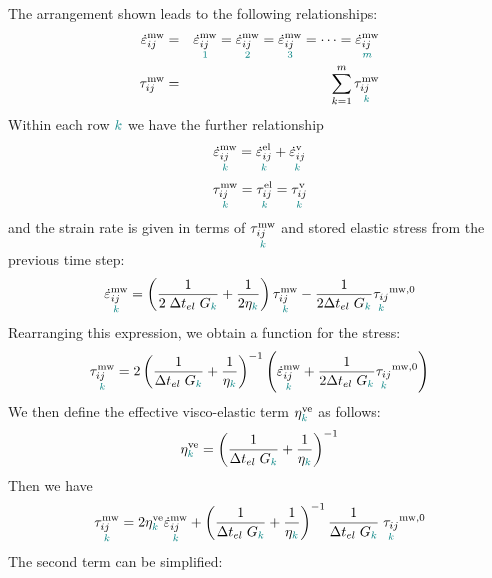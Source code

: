 The arrangement shown leads to the following relationships:
\begin{eqnarray}
\dot\varepsilon_{ij}^{\rm mw} &=&  
\underset{\color{teal} 1}{\dot\varepsilon_{ij}^{\rm mw}}  
=\underset{\color{teal}2}{\dot\varepsilon_{ij}^{\rm mw}}  
=\underset{\color{teal} 3}{\dot\varepsilon_{ij}^{\rm mw}}  
=\dots
=\underset{\color{teal} m}{\dot\varepsilon_{ij}^{\rm mw}} \label{eqbob1}
\\
\tau_{ij}^{\rm mw} &=&  \sum_{k=1}^m  \underset{\color{teal}k}{\tau_{ij}^{\rm mw}}
\label{eqbob2}
\end{eqnarray}
Within each row ${\color{teal}k}$ we have the further relationship
\[
\underset{\color{teal}k}{\dot\varepsilon_{ij}^{\rm mw}}  
=\underset{\color{teal} k}{\dot\varepsilon_{ij}^{\rm el}}  
+\underset{\color{teal} k}{\dot\varepsilon_{ij}^{\rm v}}  
\]
\[
\underset{\color{teal} k}{\tau_{ij}^{\rm mw}} 
= \underset{\color{teal} k}{\tau_{ij}^{\rm el}} 
= \underset{\color{teal} k}{\tau_{ij}^{\rm v}}  
\]
and the strain rate is given in terms of 
$\underset{\color{teal} k}{\tau_{ij}^{\rm mw}}$
and stored elastic stress from the previous time step:
\[
\underset{\color{teal}k}{\dot\varepsilon_{ij}^{\rm mw}}
=\left(
\frac{1}{2\; \Delta t_{el} \; G_{\color{teal}k} } 
+ \frac{1}{2 \eta_{\color{teal}k}} 
\right)
\underset{\color{teal} k}{\tau_{ij}^{\rm mw}}
- \frac{1}{2 \Delta t_{el} \; G_{\color{teal}k}  }
\underset{\color{teal} k}{\tau_{ij}}^{\rm mw,0}
\]
Rearranging this expression, we obtain a function for the stress:
\[
\underset{\color{teal} k}{\tau_{ij}^{\rm mw}}
= 2 
\left(
\frac{1}{\Delta t_{el} \; G_{\color{teal}k} } 
+ \frac{1}{\eta_{\color{teal}k}}
\right) ^{-1}
\left(
\underset{\color{teal}k}{\dot\varepsilon_{ij}^{\rm mw}}
+ \frac{1}{2 \Delta t_{el} \; G_{\color{teal}k}  }
\underset{\color{teal} k}{\tau_{ij}}^{\rm mw,0}
\right)
\]
We then define the effective visco-elastic term $\eta^{\rm ve}_{\color{teal}k}$
as follows:
\[
\eta^{\rm ve}_{\color{teal}k}
=
\left(
\frac{1}{\Delta t_{el} \; G_{\color{teal}k} } 
+ \frac{1}{\eta_{\color{teal}k}}
\right) ^{-1}
\]
Then we have 
\[
\underset{\color{teal} k}{\tau_{ij}^{\rm mw}}
= 2 
\eta^{\rm ve}_{\color{teal}k}
\underset{\color{teal}k}{\dot\varepsilon_{ij}^{\rm mw}}
+
\left( \frac{1}{\Delta t_{el} \; G_{\color{teal}k} } 
+ \frac{1}{\eta_{\color{teal}k}} \right) ^{-1}
\frac{1}{ \Delta t_{el} \; G_{\color{teal}k}  } \;
\underset{\color{teal} k}{\tau_{ij}}^{\rm mw,0}
\]
The second term can be simplified:

